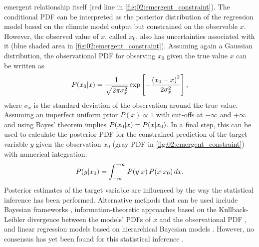 emergent relationship itself (red line in \cref{fig:02:emergent_constraint}).
The conditional \ac{PDF} can be interpreted as the posterior distribution of
the regression model based on the climate model output but constrained on the
observable $x$. However, the observed value of $x$, called $x_0$, also has
uncertainties associated with it (blue shaded area in
\cref{fig:02:emergent_constraint}). Assuming again a Gaussian distribution, the
observational \ac{PDF} for observing $x_0$ given the true value $x$ can be
written as
\begin{equation}
  P(x_0|x) = \frac{1}{\sqrt{2 \pi \sigma_x^2}} \exp \left[ -\frac{\left(
    x_0 - x \right)^2}{2 \sigma_x^2} \right],
  \label{eq:02:pdf_obs}
\end{equation}
where $\sigma_x$ is the standard deviation of the observation around the true
value. Assuming an imperfect uniform prior $P(x) \propto 1$ with cut-offs at
$-\infty$ and $+\infty$ and using Bayes' theorem implies $P(x_0|x) =
P(x|x_0)$. In a final step, this can be used to calculate the posterior
\ac{PDF} for the constrained prediction of the target variable $y$ given the
observation $x_0$ (gray \ac{PDF} in \cref{fig:02:emergent_constraint}) with
numerical integration:
\begin{equation}
  P(y|x_0) = \int_{-\infty}^{+\infty} P(y|x) \, P(x|x_0) \, d{}x.
  \label{eq:02:pdf_y_given_x0}
\end{equation}
Posterior estimates of the target variable are influenced by the way the
statistical inference has been performed. Alternative methods that can be used
include Bayesian frameworks \autocite{Renoult2020}, information-theoretic
approaches based on the Kullback-Leibler divergence between the models'
\acp{PDF} of $x$ and the observational \ac{PDF} \autocite{Brient2016}, and
linear regression models based on hierarchical Bayesian models
\autocite{Nijsse2020}. However, no consensus has yet been found for this
statistical inference \autocite{Brient2020}.

